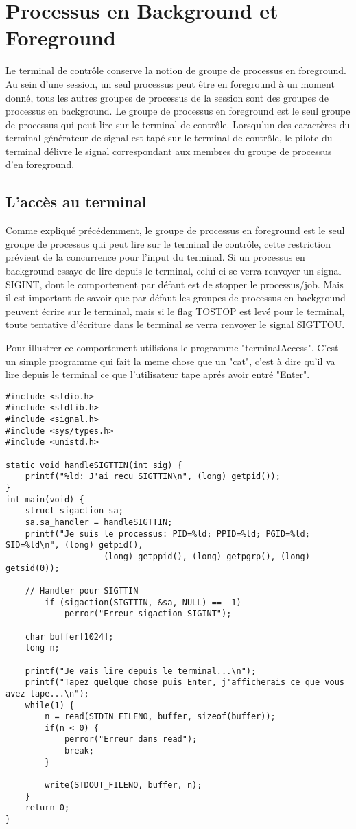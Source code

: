\section{Processus en Background et Foreground}

Le terminal de contrôle conserve la notion de groupe de processus en foreground. Au sein d'une session, un seul processus peut être en foreground
à un moment donné, tous les autres groupes de processus de la session sont des groupes de processus en background. Le groupe de processus en foreground
est le seul groupe de processus qui peut lire sur le terminal de contrôle. Lorsqu'un des caractères du terminal générateur de signal est tapé sur
le terminal de contrôle, le pilote du terminal délivre le signal correspondant aux membres du groupe de processus d’en foreground.


\subsection{L’accès au terminal}

Comme expliqué précédemment, le groupe de processus en foreground est le seul groupe de processus qui peut lire sur le terminal de contrôle,
cette restriction prévient de la concurrence pour l’input du terminal. Si un processus en background essaye de lire depuis le terminal, celui-ci
se verra renvoyer un signal SIGINT, dont le comportement par défaut est de stopper le processus/job. Mais il est important de savoir que par défaut
les groupes de processus en background peuvent écrire sur le terminal, mais si le flag TOSTOP est levé pour le terminal, toute tentative d’écriture
dans le terminal se verra renvoyer le signal SIGTTOU.

Pour illustrer ce comportement utilisions le programme "terminalAccess". C'est un simple programme qui fait la meme chose que un "cat", c'est à dire
qu'il va lire depuis le terminal ce que l'utilisateur tape aprés avoir entré "Enter".

\begin{lstlisting}[caption={terminalAccess.c}, label={terminalAccess.c}]
#include <stdio.h>
#include <stdlib.h>
#include <signal.h>
#include <sys/types.h>
#include <unistd.h>

static void handleSIGTTIN(int sig) {
    printf("%ld: J'ai recu SIGTTIN\n", (long) getpid());
}
int main(void) {
	struct sigaction sa;
	sa.sa_handler = handleSIGTTIN;
	printf("Je suis le processus: PID=%ld; PPID=%ld; PGID=%ld; SID=%ld\n", (long) getpid(),
                    (long) getppid(), (long) getpgrp(), (long) getsid(0));

	// Handler pour SIGTTIN
    	if (sigaction(SIGTTIN, &sa, NULL) == -1)
        	perror("Erreur sigaction SIGINT");

	char buffer[1024];
	long n;

	printf("Je vais lire depuis le terminal...\n");
	printf("Tapez quelque chose puis Enter, j'afficherais ce que vous avez tape...\n");
	while(1) {
		n = read(STDIN_FILENO, buffer, sizeof(buffer));
		if(n < 0) {
			perror("Erreur dans read");
			break;
		}

		write(STDOUT_FILENO, buffer, n);
	}
	return 0;
}
\end{lstlisting}

